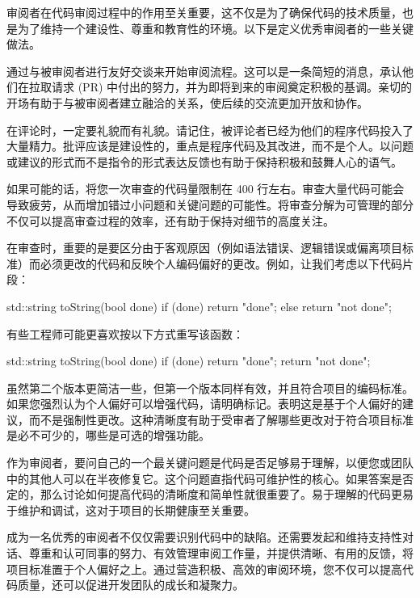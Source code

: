 
审阅者在代码审阅过程中的作用至关重要，这不仅是为了确保代码的技术质量，也是为了维持一个建设性、尊重和教育性的环境。以下是定义优秀审阅者的一些关键做法。


通过与被审阅者进行友好交谈来开始审阅流程。这可以是一条简短的消息，承认他们在拉取请求 (PR) 中付出的努力，并为即将到来的审阅奠定积极的基调。亲切的开场有助于与被审阅者建立融洽的关系，使后续的交流更加开放和协作。


在评论时，一定要礼貌而有礼貌。请记住，被评论者已经为他们的程序代码投入了大量精力。批评应该是建设性的，重点是程序代码及其改进，而不是个人。以问题或建议的形式而不是指令的形式表达反馈也有助于保持积极和鼓舞人心的语气。


如果可能的话，将您一次审查的代码量限制在 400 行左右。审查大量代码可能会导致疲劳，从而增加错过小问题和关键问题的可能性。将审查分解为可管理的部分不仅可以提高审查过程的效率，还有助于保持对细节的高度关注。


在审查时，重要的是要区分由于客观原因（例如语法错误、逻辑错误或偏离项目标准）而必须更改的代码和反映个人编码偏好的更改。例如，让我们考虑以下代码片段：

\begin{cpp}
std::string toString(bool done) {
    if (done) {
        return "done";
    } else {
        return "not done";
    }
}
\end{cpp}

有些工程师可能更喜欢按以下方式重写该函数：

\begin{cpp}
std::string toString(bool done) {
    if (done) {
        return "done";
    }
    return "not done";
}
\end{cpp}

虽然第二个版本更简洁一些，但第一个版本同样有效，并且符合项目的编码标准。如果您强烈认为个人偏好可以增强代码，请明确标记。表明这是基于个人偏好的建议，而不是强制性更改。这种清晰度有助于受审者了解哪些更改对于符合项目标准是必不可少的，哪些是可选的增强功能。


作为审阅者，要问自己的一个最关键问题是代码是否足够易于理解，以便您或团队中的其他人可以在半夜修复它。这个问题直指代码可维护性的核心。如果答案是否定的，那么讨论如何提高代码的清晰度和简单性就很重要了。易于理解的代码更易于维护和调试，这对于项目的长期健康至关重要。

成为一名优秀的审阅者不仅仅需要识别代码中的缺陷。还需要发起和维持支持性对话、尊重和认可同事的努力、有效管理审阅工作量，并提供清晰、有用的反馈，将项目标准置于个人偏好之上。通过营造积极、高效的审阅环境，您不仅可以提高代码质量，还可以促进开发团队的成长和凝聚力。




















